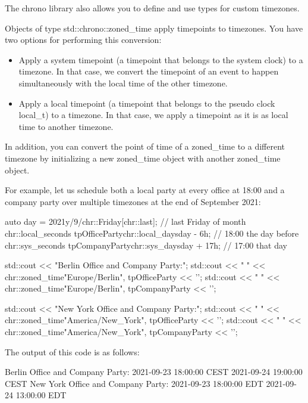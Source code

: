 The chrono library also allows you to define and use types for custom timezones.


Objects of type std::chrono::zoned\_time apply timepoints to timezones. You have two options for performing this conversion:

\begin{itemize}
\item 
Apply a system timepoint (a timepoint that belongs to the system clock) to a timezone. In that case, we convert the timepoint of an event to happen simultaneously with the local time of the other timezone.

\item
Apply a local timepoint (a timepoint that belongs to the pseudo clock local\_t) to a timezone. In that case, we apply a timepoint as it is as local time to another timezone.
\end{itemize}

In addition, you can convert the point of time of a zoned\_time to a different timezone by initializing a new zoned\_time object with another zoned\_time object.

For example, let us schedule both a local party at every office at 18:00 and a company party over multiple timezones at the end of September 2021:

\begin{cpp}
auto day = 2021y/9/chr::Friday[chr::last]; // last Friday of month
chr::local_seconds tpOfficeParty{chr::local_days{day} - 6h}; // 18:00 the day before
chr::sys_seconds tpCompanyParty{chr::sys_days{day} + 17h}; // 17:00 that day

std::cout << "Berlin Office and Company Party:\n";
std::cout << " " << chr::zoned_time{"Europe/Berlin", tpOfficeParty} << '\n';
std::cout << " " << chr::zoned_time{"Europe/Berlin", tpCompanyParty} << '\n';

std::cout << "New York Office and Company Party:\n";
std::cout << " " << chr::zoned_time{"America/New_York", tpOfficeParty} << '\n';
std::cout << " " << chr::zoned_time{"America/New_York", tpCompanyParty} << '\n';
\end{cpp}

The output of this code is as follows:

\begin{shell}
Berlin Office and Company Party:
  2021-09-23 18:00:00 CEST
  2021-09-24 19:00:00 CEST
New York Office and Company Party:
  2021-09-23 18:00:00 EDT
  2021-09-24 13:00:00 EDT
\end{shell}

